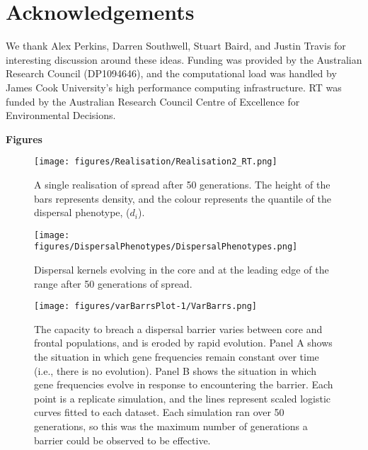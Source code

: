 \documentclass{article}
\begin{document}
\section{Acknowledgements}
We thank Alex Perkins, Darren Southwell, Stuart Baird, and Justin Travis for interesting discussion around these ideas.  Funding was provided by the Australian Research Council (DP1094646), and the computational load was handled by James Cook University's high performance computing infrastructure. RT was funded by the Australian Research Council Centre of Excellence for Environmental Decisions.
    
 

 
 
 \newpage
 \bf{Figures}
 \bigskip
 
 \begin{figure}[h!]
\begin{center}
\texttt{[image: figures/Realisation/Realisation2\_RT.png]}
\caption{\label{fig:realisation}
A single realisation of spread after 50 generations.  The height of the bars represents density, and the colour represents the quantile of the dispersal phenotype, ($d_i$).%
}
\end{center}
\end{figure}

\begin{figure}[h!]
\begin{center}
\texttt{[image: figures/DispersalPhenotypes/DispersalPhenotypes.png]}
\caption{\label{fig:kernels}
Dispersal kernels evolving in the core and at the leading edge
of the range after 50 generations of spread.%
}
\end{center}
\end{figure}

\begin{figure}[h!]
\begin{center}
\texttt{[image: figures/varBarrsPlot-1/VarBarrs.png]}
\caption{\label{fig:varbars}
The capacity to breach a dispersal barrier varies between core
and frontal populations, and is eroded by rapid evolution. Panel A shows the situation in which gene frequencies remain constant over time (i.e., there is no evolution).  Panel B shows the situation in which gene frequencies evolve in response to encountering the barrier.  Each point is a replicate simulation, and the
lines represent scaled logistic curves fitted to each dataset. Each
simulation ran over 50 generations, so this was the maximum number of
generations a barrier could be observed to be effective.
}
\end{center}
\end{figure}
\end{document}
